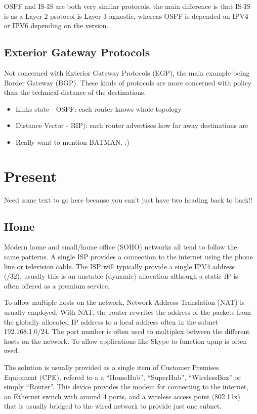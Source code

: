 \documentclass[12pt]{report}
\begin{document}
OSPF and IS-IS are both very similar protocols, the main difference is that
IS-IS is as a Layer 2 protocol is Layer 3 agnostic, whereas OSPF is depended on
IPV4 or IPV6 depending on the version.

\subsection{Exterior Gateway Protocols}
Not concerned with Exterior Gateway Protocols (EGP), the main example being
Border Gateway (BGP). These kinds of protocols are more concerned with policy
than the technical distance of the destinations.

\begin{itemize}
\item Links state - OSPF: each router knows whole topology
\item Distance Vector - RIP): each router advertises how far away destinations are
\item Really want to mention BATMAN. ;)
\end{itemize}

\section{Present}
Need some text to go here because you can't just have two heading back to back!!

\subsection{Home}
Modern home and small/home office (SOHO) networks all tend to follow the same
patterns. A single ISP provides a connection to the internet using the phone
line or television cable.  The ISP will typically provide a single IPV4 address
(/32), usually this is an unstable (dynamic) allocation although a static IP is
often offered as a premium service. 

To allow multiple hosts on the network, Network Address Translation (NAT) is
usually employed. With NAT, the router rewrites the address of the packets from
the globally allocated IP address to a local address often in the subnet
192.168.1.0/24. The port number is often used to multiplex between the
different hosts on the network. To allow applications like Skype to function
upnp is often used. 

The solution is usually provided as a single item of Customer Premises
Equipment (CPE), refered to a a ``HomeHub'', ``SuperHub'', ``WirelessBox'' or
simply ``Router''. This device provides the modem for connecting to the
internet, an Ethernet switch with around 4 ports, and a wireless access point
(802.11x) that is usually bridged to the wired network to provide just one
subnet. 
\end{document}
